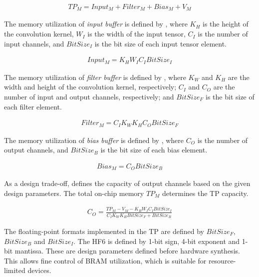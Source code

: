 \begin{eqnarray} \label{eq:tp_memory}
TP_{M}=Input_{M}+Filter_{M}+Bias_{M}+V_{M}
\end{eqnarray}

The memory utilization of \emph{input buffer} is defined by , where $K_{H}$ is the height of the convolution kernel, $W_{I}$ is the width of the input tensor, $C_{I}$ is the number of input channels, and $BitSize_{I}$ is the bit size of each input tensor element.

\begin{eqnarray} \label{eq:input_memory}
Input_{M}=K_{H}W_{I}C_{I}BitSize_{I}
\end{eqnarray}

The memory utilization of \emph{filter buffer} is defined by , where $K_{W}$ and $K_{H}$ are the width and height of the convolution kernel, respectively; $C_{I}$ and $C_{O}$ are the number of input and output channels, respectively; and $BitSize_{F}$ is the bit size of each filter element.

\begin{eqnarray} \label{eq:filter_memory}
Filter_{M}=C_{I}K_{W}K_{H}C_{O}BitSize_{F}
\end{eqnarray}

The memory utilization of \emph{bias buffer} is defined by , where $C_{O}$ is the number of output channels, and $BitSize_{B}$ is the bit size of each bias element.

\begin{eqnarray} \label{eq:bias_memory}
Bias_{M}=C_{O}BitSize_{B}
\end{eqnarray}

As a design trade-off,  defines the capacity of output channels based on the given design parameters. The total on-chip memory $TP_{M}$ determines the TP capacity.

\begin{eqnarray} \label{eq:channel_in_memory}
C_{O}=\frac{TP_{M}-V_{M}-K_{H}W_{I}C_{I}BitSize_{I}}{C_{I}K_{W}K_{H}BitSize_{F}+BitSize_{B}}
\end{eqnarray}

The floating-point formats implemented in the TP are defined by $BitSize_F$, $BitSize_B$ and $BitSize_I$. The HF6 is defined by 1-bit sign, 4-bit exponent and 1-bit mantissa. These are design parameters defined before hardware synthesis. This allows fine control of BRAM utilization, which is suitable for resource-limited devices.


